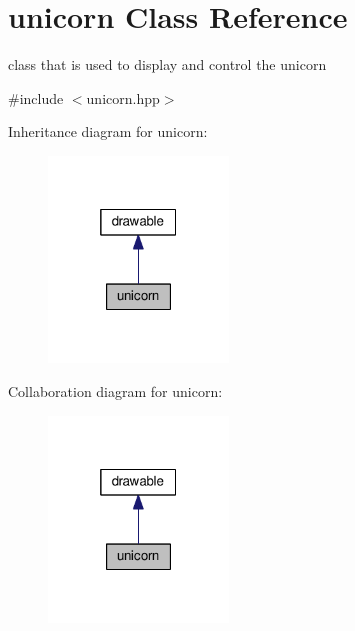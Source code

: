 \hypertarget{classunicorn}{}\section{unicorn Class Reference}
\label{classunicorn}


class that is used to display and control the unicorn  




{\ttfamily \#include $<$unicorn.\+hpp$>$}



Inheritance diagram for unicorn\+:\nopagebreak
\begin{figure}[H]
\begin{center}
\leavevmode
\includegraphics[width=136pt]{classunicorn__inherit__graph}
\end{center}
\end{figure}


Collaboration diagram for unicorn\+:\nopagebreak
\begin{figure}[H]
\begin{center}
\leavevmode
\includegraphics[width=136pt]{classunicorn__coll__graph}
\end{center}
\end{figure}
